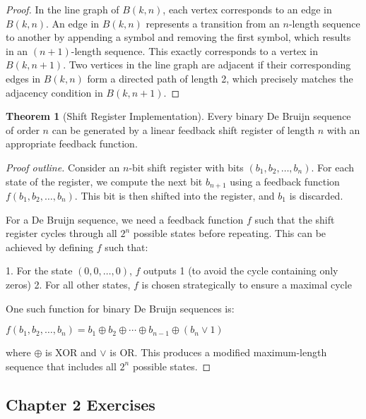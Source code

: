 \documentclass{article}
\theoremstyle{definition}
\newtheorem{theorem}{Theorem}
\begin{document}
\begin{proof}
In the line graph of $B(k,n)$, each vertex corresponds to an edge in $B(k,n)$. An edge in $B(k,n)$ represents a transition from an $n$-length sequence to another by appending a symbol and removing the first symbol, which results in an $(n+1)$-length sequence. This exactly corresponds to a vertex in $B(k,n+1)$. Two vertices in the line graph are adjacent if their corresponding edges in $B(k,n)$ form a directed path of length 2, which precisely matches the adjacency condition in $B(k,n+1)$.
\end{proof}
\begin{theorem}[Shift Register Implementation]
Every binary De Bruijn sequence of order $n$ can be generated by a linear feedback shift register of length $n$ with an appropriate feedback function.
\end{theorem}

\begin{proof}[Proof outline]
Consider an $n$-bit shift register with bits $(b_1, b_2, \ldots, b_n)$. For each state of the register, we compute the next bit $b_{n+1}$ using a feedback function $f(b_1, b_2, \ldots, b_n)$. This bit is then shifted into the register, and $b_1$ is discarded.

For a De Bruijn sequence, we need a feedback function $f$ such that the shift register cycles through all $2^n$ possible states before repeating. This can be achieved by defining $f$ such that:

1. For the state $(0, 0, \ldots, 0)$, $f$ outputs 1 (to avoid the cycle containing only zeros)
2. For all other states, $f$ is chosen strategically to ensure a maximal cycle

One such function for binary De Bruijn sequences is:
\begin{center}
$f(b_1, b_2, \ldots, b_n) = b_1 \oplus b_2 \oplus \cdots \oplus b_{n-1} \oplus (b_n \lor 1)$
\end{center}
where $\oplus$ is XOR and $\lor$ is OR. This produces a modified maximum-length sequence that includes all $2^n$ possible states.
\end{proof}
\pagebreak
\pagebreak
\clearpage
\subsection{Chapter 2 Exercises}
\end{document}
